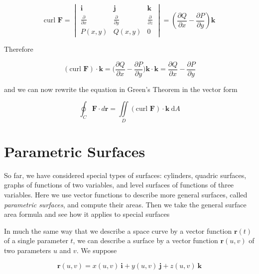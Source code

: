 \documentclass{article}
\begin{document}
\begin{equation*}
    \text{curl } \mathbf{F} = \begin{vmatrix}
        \mathbf{i} & \mathbf{j} & \mathbf{k} \\[6pt]
        \frac{\partial }{\partial x} & \frac{\partial}{\partial y} & \frac{\partial}{\partial z} \\[6pt] 
        P(x,y) & Q(x,y) & 0
    \end{vmatrix} = (\frac{\partial Q}{\partial x} - \frac{\partial P}{\partial y}) \mathbf{k}
\end{equation*}

Therefore

\begin{equation*}
    (\text{curl } \mathbf{F}) \cdot \mathbf{k} = \bigg( \frac{\partial Q}{\partial x} - \frac{\partial P}{\partial y} \bigg) \mathbf{k} \cdot \mathbf{k} = \frac{\partial Q}{\partial x} - \frac{\partial P}{\partial y}
\end{equation*}

and we can now rewrite the equation in Green's Theorem in the vector form 

\begin{equation*}
    \oint_C \mathbf{F} \cdot d \mathbf{r} = \iint\limits_D (\text{curl } \mathbf{F}) \cdot \mathbf{k} \ \mathrm{d} A
\end{equation*}

\newpage
\section{Parametric Surfaces}

So far, we have considered special types of surfaces: cylinders, quadric surfaces, graphs of functions of two variables, and level surfaces of functions of three variables. Here we use vector functions to describe more general surfaces, called \textit{parametric surfaces}, and compute their areas. Then we take the general surface area formula and see how it applies to special surfaces

In much the same way that we describe a space curve by a vector function $\mathbf{r}(t)$ of a single parameter $t$, we can describe a surface by a vector function $\mathbf{r}(u,v)$ of two parameters $u$ and $v$. We suppose

\begin{equation*}
    \mathbf{r}(u,v) = x(u,v) \ \mathbf{i} + y(u,v) \ \mathbf{j} + z(u,v) \ \mathbf{k}
\end{equation*}
\end{document}
